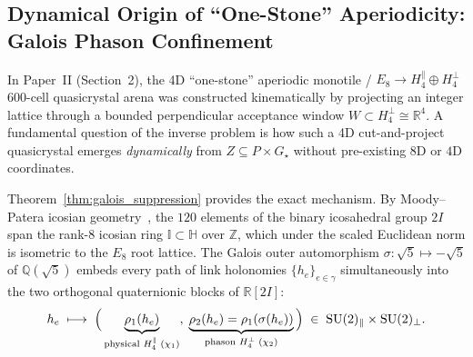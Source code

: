 \documentclass[11pt,a4paper]{article}
\theoremstyle{definition}
\theoremstyle{remark}
\newcommand{\R}{\mathbb{R}}
\newcommand{\quat}{\mathbb{H}}
\newcommand{\Z}{\mathbb{Z}}
\newcommand{\Q}{\mathbb{Q}}
\newcommand{\SU}{\operatorname{SU}}
\newcommand{\Gstar}{G_\star}
\begin{document}
\subsection{Dynamical Origin of ``One-Stone'' Aperiodicity: Galois Phason Confinement}

In Paper~II (Section~2), the 4D ``one-stone'' aperiodic monotile / $E_8 \to H_4^\parallel \oplus H_4^\perp$ $600$-cell quasicrystal arena was constructed kinematically by projecting an integer lattice through a bounded perpendicular acceptance window $W \subset H_4^\perp \cong \R^4$. A fundamental question of the inverse problem is how such a 4D cut-and-project quasicrystal emerges \emph{dynamically} from $Z \subseteq P \times \Gstar$ without pre-existing $8\text{D}$ or $4\text{D}$ coordinates.

Theorem~\ref{thm:galois_suppression} provides the exact mechanism. By Moody--Patera icosian geometry~\cite{MoodyPatera1993}, the $120$ elements of the binary icosahedral group $2I$ span the rank-$8$ icosian ring $\mathbb{I} \subset \quat$ over $\Z$, which under the scaled Euclidean norm is isometric to the $E_8$ root lattice. The Galois outer automorphism $\sigma : \sqrt{5} \mapsto -\sqrt{5}$ of $\Q(\sqrt{5})$ embeds every path of link holonomies $\{h_e\}_{e \in \gamma}$ simultaneously into the two orthogonal quaternionic blocks of $\R[2I]$:
\begin{equation}
\label{eq:dual_embedding}
h_e \;\longmapsto\; \Bigl(\,\underbrace{\rho_1(h_e)}_{\text{physical } H_4^\parallel\; (\chi_1)},\; \underbrace{\rho_2(h_e) = \rho_1(\sigma(h_e))}_{\text{phason } H_4^\perp\; (\chi_2)}\,\Bigr) \;\in\; \SU(2)_\parallel \times \SU(2)_\perp.
\end{equation}
\end{document}
